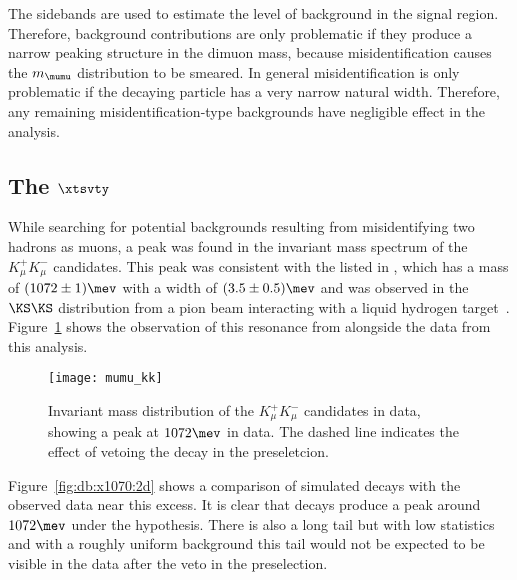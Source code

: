 The sidebands are used to estimate the level of background in the signal region.
Therefore, background
contributions are only problematic if they produce a narrow peaking structure in the dimuon mass,
because misidentification causes the $m_{\mumu}$ distribution to be smeared.
In general misidentification is only problematic if the decaying particle has a very narrow natural
width.
Therefore, any remaining misidentification-type backgrounds have negligible effect in the analysis.


\subsection[The \xtsvty]{The $\boldsymbol{\xtsvty}$}
\label{sec:x1070}
While searching for potential backgrounds resulting from misidentifying two hadrons as muons, a
peak was found in the invariant mass spectrum of the $K_\mu^+K_\mu^-$ candidates.
This peak was consistent with the \xtsvty listed in , which has a mass of
$(1072\pm1)\mev$ with a width of $(3.5\pm0.5)\mev$ and was observed in the $\KS\KS$ distribution
from a pion beam interacting with a liquid hydrogen target~\cite{x1070vlad}.
Figure~\ref{fig:x1070} shows the observation of this resonance from  alongside
the data from this analysis.

\begin{figure}
  \begin{center}
    \texttt{[image: mumu\_kk]}
    \caption[Invariant mass of the \mumu distribution under the \kk mass hypotheses]
    {
      Invariant mass distribution of the $K_\mu^+K_\mu^-$ candidates in data, showing a peak at
      \approx$1072\mev$ in data.
      The dashed line indicates the effect of vetoing the decay
      \decay{\KS}{\pip\pim} in the preseletcion.
    }
    \label{fig:x1070}
  \end{center}
\end{figure}

Figure~\ref{fig:db:x1070:2d} shows a comparison of simulated \decay{\KS}{\pipi} decays with the
observed data near this excess.
It is clear that \decay{\KS}{\pipi} decays produce a peak around $1072\mev$ under the \kk
hypothesis.
There is also a long tail but with low statistics and with a roughly uniform
background this tail would not be expected to be visible in the data after the \KS veto in the
preselection.

